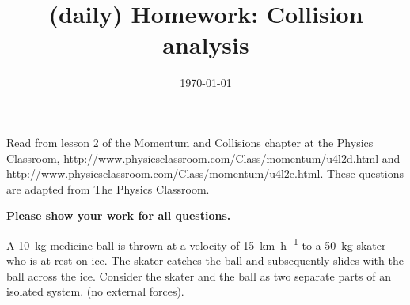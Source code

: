 \documentclass[hw,addpoints,noanswers]{exam}
\title{(daily) Homework: Collision analysis}
\author{\mobeardInstructorShort}
\date{\today}
\begin{document}
\maketitle

Read from lesson 2 of the Momentum and Collisions chapter at the Physics Classroom, \url{http://www.physicsclassroom.com/Class/momentum/u4l2d.html} and \url{http://www.physicsclassroom.com/Class/momentum/u4l2e.html}. These questions are adapted from The Physics Classroom. 

\textbf{Please show your work for all questions.}

\begin{questions}
\question
A \SI{10}{\kilo\gram} medicine ball is thrown at a velocity of \SI{15}{\kilo\meter\per\hour} to a \SI{50}{\kilo\gram} skater who is at rest on ice. The skater catches the ball and subsequently slides with the ball across the ice. Consider the skater and the ball as two separate parts of an isolated system. (no external forces). 
\begin{parts}

\end{parts}
\end{questions}
\end{document}
